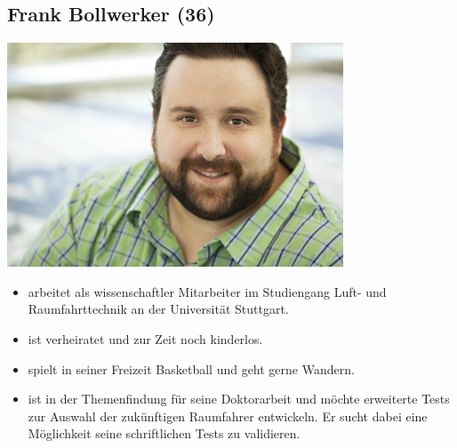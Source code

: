 \documentclass[10pt, a4paper, oneside, titlepage]{scrartcl} %
\begin{document}
   	\subsection{Frank Bollwerker (36)}
   	\begin{center}
		\includegraphics[width=10.0cm]{persona_02.jpg}
	\end{center}
	\begin{itemize}
		\item{}arbeitet als wissenschaftler Mitarbeiter im Studiengang Luft- und Raumfahrttechnik an der Universität Stuttgart.
		\item{}ist verheiratet und zur Zeit noch kinderlos. 
		\item{}spielt in seiner Freizeit Basketball und geht gerne Wandern.
		\item{}ist in der Themenfindung für seine Doktorarbeit und möchte erweiterte Tests zur Auswahl der zukünftigen Raumfahrer entwickeln. Er sucht dabei eine 		Möglichkeit seine schriftlichen Tests zu validieren.
	\end{itemize}		
\end{document}
